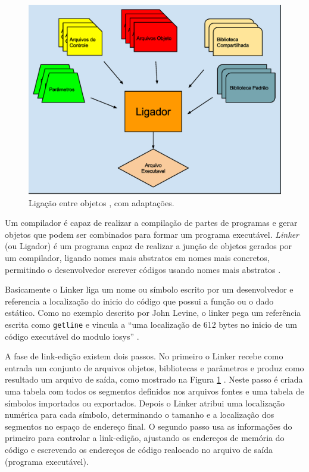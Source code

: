\begin{figure}[h]
    \centering
        \includegraphics[keepaspectratio=true,scale=0.5]{figuras/ligador.eps}
    \caption{Ligação entre objetos \cite[pág.  7]{ref36}, com adaptações.}
    \label{fig03}
\end{figure}

Um compilador é capaz de realizar a compilação de partes de programas e gerar
 objetos que podem ser combinados para formar um programa executável. 
\textit{Linker} (ou Ligador) é um programa capaz de realizar a junção 
de objetos gerados por um compilador, ligando nomes mais abstratos em nomes
 mais concretos, permitindo o desenvolvedor escrever códigos usando nomes 
mais abstratos \cite{ref36}.


 Basicamente o Linker liga um nome ou símbolo escrito por um desenvolvedor e
 referencia a localização do inicio do código que possui a função ou o dado
 estático. Como no exemplo descrito por John Levine, o linker pega um 
referência escrita como \texttt{getline}  e vincula a “uma localização de 612 bytes 
no inicio de um código executável do modulo iosys” \cite[pág. 7]{ref36}. 

A fase de link-edição existem dois passos. No primeiro o Linker recebe como 
entrada um conjunto de arquivos objetos, bibliotecas e parâmetros e produz
 como resultado um arquivo de saída, como mostrado na Figura \ref{fig03}
 \cite[pág. 13]{ref36}. Neste passo é criada uma tabela com 
todos os segmentos definidos nos arquivos fontes e uma tabela de símbolos 
importados ou exportados. Depois o Linker atribui uma localização numérica 
para cada símbolo, determinando o tamanho e a localização dos segmentos no
 espaço de endereço final. O segundo passo usa as informações do primeiro
 para controlar a link-edição, ajustando os endereços de memória do código e
 escrevendo os endereços de código realocado no arquivo de saída
 (programa executável).


